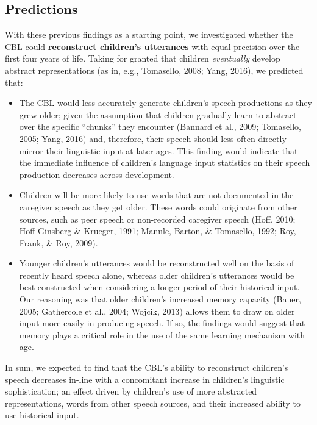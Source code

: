 \documentclass[
  english,
  man,mask,floatsintext]{apa6}
\providecommand{\tightlist}{%
  \setlength{\itemsep}{0pt}\setlength{\parskip}{0pt}}
\begin{document}
\hypertarget{predictions}{%
\subsection{Predictions}\label{predictions}}

With these previous findings as a starting point, we investigated whether the CBL could \textbf{reconstruct children's utterances} with equal precision over the first four years of life. Taking for granted that children \emph{eventually} develop abstract representations (as in, e.g., Tomasello, 2008; Yang, 2016), we predicted that:

\begin{itemize}
\tightlist
\item
  The CBL would less accurately generate children's speech productions as they grew older; given the assumption that children gradually learn to abstract over the specific \enquote{chunks} they encounter (Bannard et al., 2009; Tomasello, 2005; Yang, 2016) and, therefore, their speech should less often directly mirror their linguistic input at later ages. This finding would indicate that the immediate influence of children's language input statistics on their speech production decreases across development.
\item
  Children will be more likely to use words that are not documented in the caregiver speech as they get older. These words could originate from other sources, such as peer speech or non-recorded caregiver speech (Hoff, 2010; Hoff-Ginsberg \& Krueger, 1991; Mannle, Barton, \& Tomasello, 1992; Roy, Frank, \& Roy, 2009).
\item
  Younger children's utterances would be reconstructed well on the basis of recently heard speech alone, whereas older children's utterances would be best constructed when considering a longer period of their historical input. Our reasoning was that older children's increased memory capacity (Bauer, 2005; Gathercole et al., 2004; Wojcik, 2013) allows them to draw on older input more easily in producing speech. If so, the findings would suggest that memory plays a critical role in the use of the same learning mechanism with age.
\end{itemize}

In sum, we expected to find that the CBL's ability to reconstruct children's speech decreases in-line with a concomitant increase in children's linguistic sophistication; an effect driven by children's use of more abstracted representations, words from other speech sources, and their increased ability to use historical input.
\end{document}
